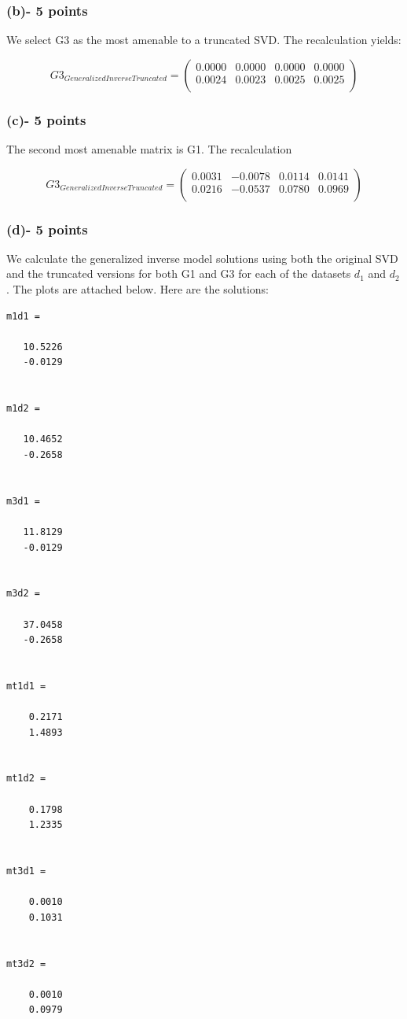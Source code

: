 \documentclass[11pt]{article}
\begin{document}
\subsubsection*{(b)- 5 points}
We select G3 as the most amenable to a truncated SVD.  The recalculation yields:

\begin{equation}
G3_{GeneralizedInverseTruncated} = 
\begin{pmatrix}
0.0000 & 0.0000 & 0.0000 & 0.0000\\
0.0024 & 0.0023 & 0.0025 & 0.0025\\
\end{pmatrix}
\end{equation}

\subsubsection*{(c)- 5 points}
The second most amenable matrix is G1.  The recalculation 

\begin{equation}
G3_{GeneralizedInverseTruncated} = 
\begin{pmatrix}
0.0031 & -0.0078 & 0.0114 & 0.0141\\
0.0216 & -0.0537 & 0.0780 & 0.0969\\
\end{pmatrix}
\end{equation}



\subsubsection*{(d)- 5 points}
We calculate the generalized inverse model solutions using both the original SVD and the truncated versions for both G1 and G3 for each of the datasets $d_1$ and $d_2$.  The plots are attached below.  Here are the solutions:

\begin{verbatim}
m1d1 =

   10.5226
   -0.0129


m1d2 =

   10.4652
   -0.2658


m3d1 =

   11.8129
   -0.0129


m3d2 =

   37.0458
   -0.2658


mt1d1 =

    0.2171
    1.4893


mt1d2 =

    0.1798
    1.2335


mt3d1 =

    0.0010
    0.1031


mt3d2 =

    0.0010
    0.0979
\end{verbatim}
\end{document}
